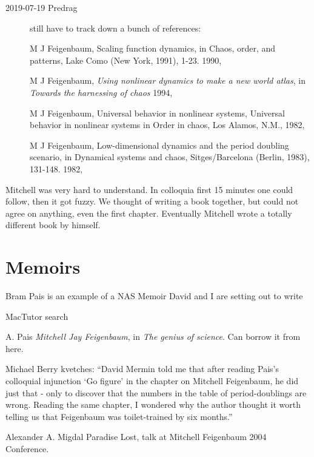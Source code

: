 \begin{description}
\item[2019-07-19 Predrag]
still have to track down a bunch of references:

M J Feigenbaum,
Scaling function dynamics,
in Chaos, order, and patterns, Lake Como (New York, 1991), 1-23.
{1990},

M J Feigenbaum, \emph{Using nonlinear dynamics to make a new world atlas}, in
 \emph{Towards the harnessing of chaos} %
{1994},

M J Feigenbaum, Universal behavior in nonlinear systems,
{Universal behavior in nonlinear systems}
in Order in chaos, Los Alamos, N.M.,
{1982},

M J Feigenbaum,
Low-dimensional dynamics and the period doubling scenario,
in Dynamical systems and chaos, Sitges/Barcelona (Berlin, 1983), 131-148.
{1982},

\end{description}


Mitchell was very hard to understand. In colloquia first 15 minutes one
could follow, then it got fuzzy. We thought of writing a book together,
but could not agree on anything, even the first chapter. Eventually
Mitchell wrote a totally different book by himself.

\section{Memoirs}
\label{sect:Memoirs}

{Bram Pais} is an example of a NAS Memoir David and I are setting out to
write

{MacTutor} search


A. Pais
{\em Mitchell Jay Feigenbaum}, in {\em The genius of science}.
Can borrow it from
 {here}.

Michael Berry
{kvetches}: ``David Mermin told me that after reading Pais's colloquial
injunction `Go figure' in the chapter on Mitchell Feigenbaum, he did just
that - only to discover that the numbers in the table of period-doublings
are wrong. Reading the same chapter, I wondered why the author thought it
worth telling us that Feigenbaum was toilet-trained by six months.''

 Alexander A. Migdal
 {Paradise Lost},
talk at Mitchell Feigenbaum 2004 Conference.


\printbibliography[heading=subbibintoc,title={References}]
